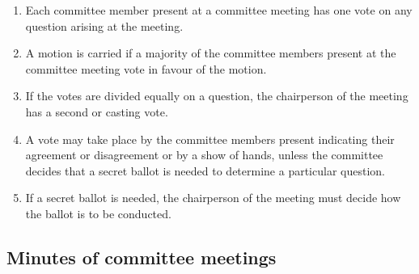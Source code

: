 \documentclass[../constitution.tex]{subfiles}
\begin{document}
\begin{enumerate}

  \item Each committee member present at a committee meeting has one vote on any question arising at the meeting.
  \item A motion is carried if a majority of the committee members present at the committee meeting vote in favour of the motion.
  \item If the votes are divided equally on a question, the chairperson of the meeting has a second or casting vote.
  \item A vote may take place by the committee members present indicating their agreement or disagreement or by a show of hands, unless the committee decides that a secret ballot is needed to determine a particular question.
  \item If a secret ballot is needed, the chairperson of the meeting must decide how the ballot is to be conducted.
\end{enumerate}

\hypertarget{minutes-of-committee-meetings}{%
  \subsection{Minutes of committee meetings}\label{minutes-of-committee-meetings}}
\end{document}
